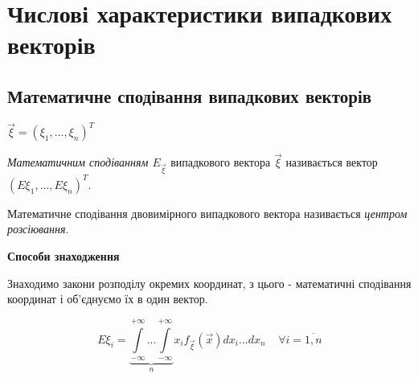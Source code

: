 \section{Числові характеристики випадкових векторів}

\subsection{Математичне сподівання випадкових векторів}
$\vec{\xi} = \left(\xi_1, ..., \xi_n\right)^T$
\begin{definition}
    \emph{Математичним сподіванням $E_{\vec{\xi}}$} 
    випадкового вектора $\vec{\xi}$ називається вектор 
    $\left(E{\xi_1}, ..., E{\xi_n}\right)^T$.
\end{definition}
\begin{remark}
    Математичне сподівання двовимірного випадкового вектора 
    називається \emph{центром розсіювання}.
\end{remark}

\noindent \textbf{Способи знаходження}

Знаходимо закони розподілу окремих координат, з цього - 
математичні сподівання координат і об'єднуємо їх в один вектор.

\begin{equation}
    E{\xi_i} = 
    \underbrace{
        \int\limits_{-\infty}^{+\infty} 
        ... 
        \int\limits_{-\infty}^{+\infty}
    }_{n} x_i f_{\vec{\xi}}(\vec{x})dx_i...dx_n 
    \;\;\;\;
    \forall i = \overline{1,n}
\end{equation}


